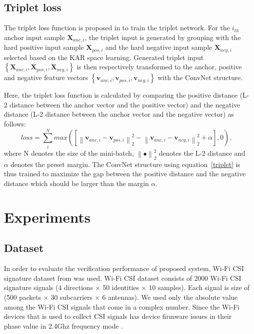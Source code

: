 \documentclass[runningheads]{llncs}
\begin{document}
\subsection{Triplet loss}

The triplet loss function is proposed in \cite{schroff2015facenet} to train the triplet network.
For the $i_{th}$ anchor input sample $\mathbf{X}_{anc,i}$, the triplet input is generated by grouping with the hard positive input sample $\mathbf{X}_{pos,i}$ and the hard negative input sample $\mathbf{X}_{neg,i}$ selected based on the KAR space learning. Generated triplet input $\left\{\mathbf{X}_{anc,i},\mathbf{X}_{pos,i},\mathbf{X}_{neg,i}\right\}$ is then respectively transformed to the anchor, positive and negative feature vectors $\left\{\mathbf{v}_{anc,i},\mathbf{v}_{pos,i},\mathbf{v}_{neg,i}\right\}$ with the ConvNet structure.

Here, the triplet loss function is calculated by comparing the positive distance (L-2 distance between the anchor vector and the positive vector) and the negative distance (L-2 distance between the anchor vector and the negative vector) as follows:
\begin{equation}
    loss = \sum_i^N max\left({ \left[ {\left\| {{\mathbf{v}_{anc,i}} - {\mathbf{v}_{pos,i}}} \right\|_2^2} - {\left\| {{\mathbf{v}_{anc,i}} - {\mathbf{v}_{neg,i}}} \right\|_2^2}  + \alpha \right]}, 0 \right),\label{triplet}
\end{equation} 
where N denotes the size of the mini-batch, ${\left\| \bullet \right\|_2^2}$ denotes the L-2 distance and $\alpha$ denotes the preset margin.
The ConvNet structure using equation~\eqref{triplet} is thus trained to maximize the gap between the positive distance and the negative distance which should be larger than the margin $\alpha$.

\section{Experiments}

\subsection{Dataset}
 In order to evaluate the verification performance of proposed system, Wi-Fi CSI signature dataset from \cite{moon2017air} was used. Wi-Fi CSI dataset consists of 2000 Wi-Fi CSI signature signals (4 directions $\times$ 50 identities $\times$ 10 samples). Each signal is size of (500 packets $\times$ 30 subcarriers $\times$ 6 antennas). We used only the absolute value among the Wi-Fi CSI signals that come in a complex number. Since the Wi-Fi devices that is used to collect CSI signals has device firmware issues in their phase value in 2.4Ghz frequency mode \cite{wang2015understanding}.
\end{document}

